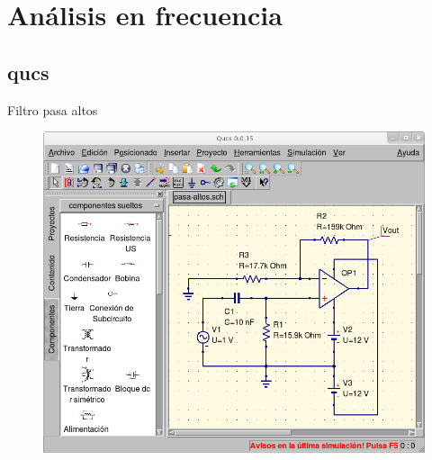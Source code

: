 \documentclass{beamer}
\begin{document}




\section{Análisis en frecuencia}

\subsection[qucs - \url{http://qucs.sourceforge.net}]{qucs}

\begin{frame}{Filtro pasa altos}
  \begin{figure}
    \centering
    \includegraphics[scale=0.4]{qucs/img/qucs-pasaltos.png}
  \end{figure}
\end{frame}
\end{document}
